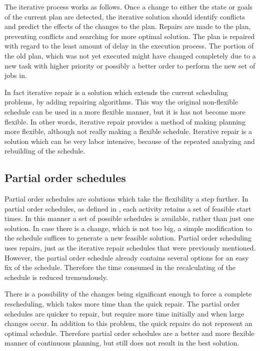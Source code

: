 \documentclass{article}
\begin{document}
The iterative process works as follows.
Once a change to either the state or goals of the current plan are detected, the iterative solution should identify conflicts and predict the effects of the changes to the plan.
Repairs are made to the plan, preventing conflicts and searching for more optimal solution.
The plan is repaired with regard to the least amount of delay in the execution process.
The portion of the old plan, which was not yet executed might have changed completely due to a new task with higher priority or possibly a better order to perform the new set of jobs in.
\cite{chien00}

In fact iterative repair is a solution which extends the current scheduling problems, by adding repairing algorithms.
This way the original non-flexible schedule can be used in a more flexible manner, but it is has not become more flexible.
In other words, iterative repair provides a method of making planning more flexible, although not really making a flexible schedule.
Iterative repair is a solution which can be very labor intensive, because of the repeated analyzing and rebuilding of the schedule.

\subsection{Partial order schedules}
Partial order schedules are solutions which take the flexibility a step further.
In partial order schedules, as defined in \cite{policella07}, each activity retains a set of feasible start times.
In this manner a set of possible schedules is available, rather than just one solution.
In case there is a change, which is not too big, a simple modification to the schedule suffices to generate a new feasible solution.
Partial order scheduling uses repairs, just as the iterative repair schedules that were previously mentioned.
However, the partial order schedule already contains several options for an easy fix of the schedule.
Therefore the time consumed in the recalculating of the schedule is reduced tremendously.

There is a possibility of the changes being significant enough to force a complete rescheduling, which takes more time than the quick repair.
The partial order schedules are quicker to repair, but require more time initially and when large changes occur.
In addition to this problem, the quick repairs do not represent an optimal schedule.
Therefore partial order schedules are a better and more flexible manner of continuous planning, but still does not result in the best solution.
\end{document}
